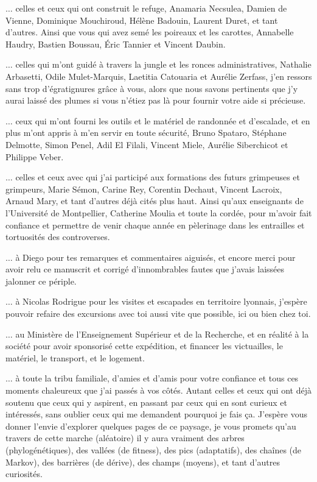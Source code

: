 $\hdots$ celles et ceux qui ont construit le refuge, Anamaria Necsulea, Damien de Vienne, Dominique Mouchiroud, Hélène Badouin, Laurent Duret, et tant d’autres.
Ainsi que vous qui avez semé les poireaux et les carottes, Annabelle Haudry, Bastien Boussau, Éric Tannier et Vincent Daubin.

$\hdots$ celles qui m’ont guidé à travers la jungle et les ronces administratives, Nathalie Arbasetti, Odile Mulet-Marquis, Laetitia Catouaria et Aurélie Zerfass, j’en ressors sans trop d’égratignures grâce à vous, alors que nous savons pertinents que j’y aurai laissé des plumes si vous n’étiez pas là pour fournir votre aide si précieuse.

$\hdots$ ceux qui m’ont fourni les outils et le matériel de randonnée et d’escalade, et en plus m’ont appris à m’en servir en toute sécurité, Bruno Spataro, Stéphane Delmotte, Simon Penel, Adil El Filali, Vincent Miele, Aurélie Siberchicot et Philippe Veber.

$\hdots$ celles et ceux avec qui j’ai participé aux formations des futurs grimpeuses et grimpeurs, Marie Sémon, Carine Rey, Corentin Dechaut, Vincent Lacroix, Arnaud Mary, et tant d’autres déjà cités plus haut.
Ainsi qu'aux enseignants de l'Université de Montpellier, Catherine Moulia et toute la cordée, pour m'avoir fait confiance et permettre de venir chaque année en pèlerinage dans les entrailles et tortuosités des controverses.

$\hdots$ à Diego pour tes remarques et commentaires aiguisés, et encore merci pour avoir relu ce manuscrit et corrigé d’innombrables fautes que j'avais laissées jalonner ce périple.

$\hdots$ à Nicolas Rodrigue pour les visites et escapades en territoire lyonnais, j'espère pouvoir refaire des excursions avec toi aussi vite que possible, ici ou bien chez toi.

$\hdots$ au Ministère de l’Enseignement Supérieur et de la Recherche, et en réalité à la société pour avoir sponsorisé cette expédition, et financer les victuailles, le matériel, le transport, et le logement.

$\hdots$ à toute la tribu familiale, d’amies et d’amis pour votre confiance et tous ces moments chaleureux que j’ai passés à vos côtés.
Autant celles et ceux qui ont déjà soutenu que ceux qui y aspirent, en passant par ceux qui en sont curieux et intéressés, sans oublier ceux qui me demandent pourquoi je fais ça.
J’espère vous donner l’envie d’explorer quelques pages de ce paysage, je vous promets qu’au travers de cette marche (aléatoire) il y aura vraiment des arbres (phylogénétiques), des vallées (de fitness), des pics (adaptatifs), des chaînes (de Markov), des barrières (de dérive), des champs (moyens), et tant d’autres curiosités.

